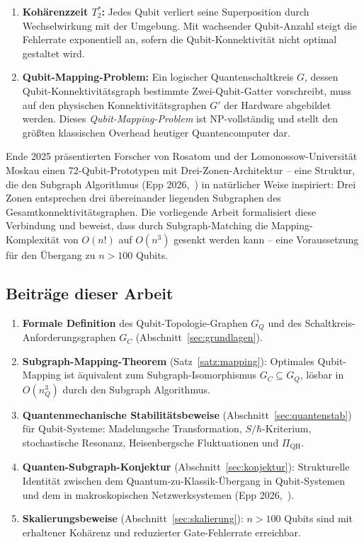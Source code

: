 ﻿\documentclass[a4paper,12pt]{article}
\theoremstyle{definition}
\begin{document}
\begin{enumerate}
\item \textbf{Kohärenzzeit $T_2^*$:} Jedes Qubit verliert seine Superposition durch
  Wechselwirkung mit der Umgebung. Mit wachsender Qubit-Anzahl steigt die Fehlerrate
  exponentiell an, sofern die Qubit-Konnektivität nicht optimal gestaltet wird.

\item \textbf{Qubit-Mapping-Problem:} Ein logischer Quantenschaltkreis $G$, dessen
  Qubit-Konnektivitätsgraph bestimmte Zwei-Qubit-Gatter vorschreibt, muss auf den
  physischen Konnektivitätsgraphen $G'$ der Hardware abgebildet werden. Dieses
  \emph{Qubit-Mapping-Problem} ist NP-vollständig und stellt den größten klassischen
  Overhead heutiger Quantencomputer dar.
\end{enumerate}

Ende 2025 präsentierten Forscher von Rosatom und der Lomonossow-Universität Moskau einen
72-Qubit-Prototypen mit Drei-Zonen-Architektur -- eine Struktur, die den Subgraph
Algorithmus (Epp 2026,~\cite{epp2026subgraph}) in natürlicher Weise inspiriert: Drei
Zonen entsprechen drei übereinander liegenden Subgraphen des Gesamtkonnektivitätsgraphen.
Die vorliegende Arbeit formalisiert diese Verbindung und beweist, dass durch
Subgraph-Matching die Mapping-Komplexität von $O(n!)$ auf $O(n^3)$ gesenkt werden kann
-- eine Voraussetzung für den Übergang zu $n > 100$ Qubits.

\subsection{Beiträge dieser Arbeit}

\begin{enumerate}
\item \textbf{Formale Definition} des Qubit-Topologie-Graphen $G_Q$ und des
  Schaltkreis-Anforderungsgraphen $G_C$ (Abschnitt~\ref{sec:grundlagen}).

\item \textbf{Subgraph-Mapping-Theorem} (Satz~\ref{satz:mapping}): Optimales
  Qubit-Mapping ist äquivalent zum Subgraph-Isomorphismus $G_C \subseteq G_Q$,
  lösbar in $O(n_Q^3)$ durch den Subgraph Algorithmus.

\item \textbf{Quantenmechanische Stabilitätsbeweise} (Abschnitt~\ref{sec:quantenstab})
  für Qubit-Systeme: Madelungsche Transformation, $S/\hbar$-Kriterium,
  stochastische Resonanz, Heisenbergsche Fluktuationen und $\Pi_\mathrm{QH}$.

\item \textbf{Quanten-Subgraph-Konjektur} (Abschnitt~\ref{sec:konjektur}):
  Strukturelle Identität zwischen dem Quantum-zu-Klassik-Übergang in Qubit-Systemen
  und dem in makroskopischen Netzwerksystemen (Epp 2026,~\cite{epp2026cnyn}).

\item \textbf{Skalierungsbeweise} (Abschnitt~\ref{sec:skalierung}): $n > 100$ Qubits
  sind mit erhaltener Kohärenz und reduzierter Gate-Fehlerrate erreichbar.
\end{enumerate}
\end{document}
